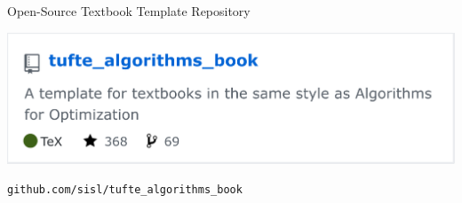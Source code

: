 \begin{frame}[fragile]{Open-Source Textbook Template Repository} \pause

\centering
\includegraphics[width=0.5\linewidth]{media/tufte_algorithms_book.png}

\textcolor{repo}{\small \texttt{github.com/sisl/tufte\_algorithms\_book}}

\end{frame}